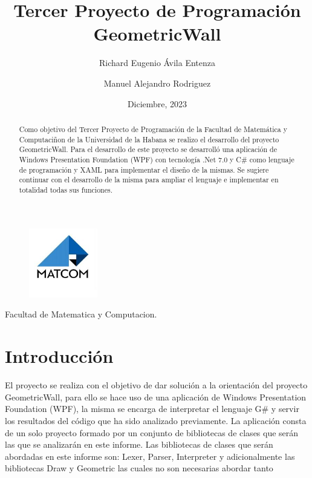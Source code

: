 \documentclass[a4paper,12pt]{article}
\begin{document}
	\title{Tercer Proyecto de Programación GeometricWall}
	\author{Richard Eugenio Ávila Entenza\\
		\and	Manuel Alejandro Rodriguez}
	\date{Diciembre, 2023}
	\maketitle
	
	\begin{figure}[h]
		\center
		\includegraphics[width=3cm]{matcom.jpg}
		\label{fig:logo}
	\end{figure}	
	\begin{center}
		\Large Facultad de Matematica y Computacion.
	\end{center}
	
	\newpage
	\begin{abstract}
		Como objetivo del Tercer Proyecto de Programación de la Facultad de Matemática y Computaciñon de la Universidad de la Habana se realizo el desarrollo del proyecto GeometricWall. Para el desarrollo de este proyecto se desarrolló una aplicación de Windows Presentation Foundation (WPF) con tecnología .Net 7.0 y C\# como lenguaje de programación y XAML para implementar el diseño de la mismas. Se sugiere continuar con el desarrollo de la misma para ampliar el lenguaje e implementar en totalidad todas sus funciones.
	\end{abstract}	
	
	\newpage
	\begin{center}
		\tableofcontents		
	\end{center}
	
	\newpage	
	\section{Introducción}\label{sec:introduccion}
	El proyecto se realiza con el objetivo de dar solución a la orientación del proyecto GeometricWall, para ello se hace uso de una aplicación de Windows Presentation Foundation (WPF), la misma se encarga de interpretar el lenguaje G\# y servir los resultados del código que ha sido analizado previamente. La aplicación consta de un solo proyecto formado por un conjunto de bibliotecas de clases que serán las que se analizarán en este informe. 
	Las bibliotecas de clases que serán abordadas en este informe son: Lexer, Parser, Interpreter y adicionalmente las bibliotecas Draw y Geometric las cuales no son necesarias abordar tanto 
	
\end{document}
